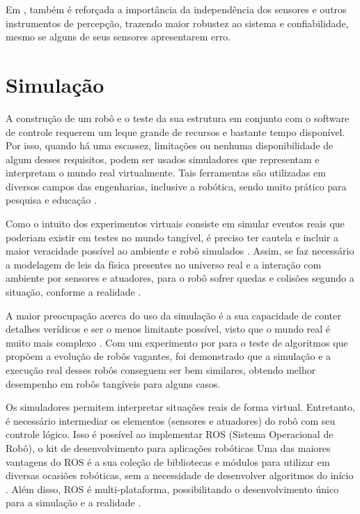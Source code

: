 Em \citet{brooks85}, também é reforçada a importância da independência dos sensores e outros instrumentos de percepção, trazendo maior robustez ao sistema e confiabilidade, mesmo se alguns de seus sensores apresentarem erro. 

\section{Simulação} %

A construção de um robô e o teste da sua estrutura em conjunto com o software de controle requerem um leque grande de recursos e bastante tempo disponível. Por isso, quando há uma escassez, limitações ou nenhuma disponibilidade de algum desses requisitos, podem ser usados simuladores que representam e interpretam o mundo real virtualmente. 
Tais ferramentas são utilizadas em diversos campos das engenharias, inclusive a robótica, sendo muito prático para pesquisa e educação \cite{usarsimCarpin:2007}. 

Como o intuito dos experimentos virtuais consiste em simular eventos reais que poderiam existir em testes no mundo tangível, é preciso ter cautela e incluir a maior veracidade possível ao ambiente e robô simulados \cite{aprendizadoHeinen:2010}.  
Assim, se faz necessário a modelagem de leis da física presentes no universo real e a interação com ambiente por sensores e atuadores, para o robô sofrer quedas e colisões segundo a situação, conforme a realidade \cite{usarsimCarpin:2007, evolucaoHeinen:2006}.  

A maior preocupação acerca do uso da simulação é a sua capacidade de conter detalhes verídicos e ser o menos limitante possível, visto que o mundo  real é muito mais complexo  \cite{wanderingMiglino:1994}. 
Com um experimento por \citet{wanderingMiglino:1994} para o teste de algoritmos que propõem a evolução de robôs vagantes, foi demonstrado que a simulação e a execução real desses robôs conseguem ser bem similares, obtendo melhor desempenho em robôs tangíveis para alguns casos.

Os simuladores permitem interpretar situações reais de forma virtual. Entretanto, é necessário intermediar os elementos (sensores e atuadores) do robô com seu controle lógico. Isso é possível ao implementar ROS (Sistema Operacional de Robô), o kit de desenvolvimento para aplicações robóticas \cite{ROS} Uma das maiores vantagens do ROS é a sua coleção de bibliotecas e módulos para utilizar em diversas ocasiões robóticas, sem a necessidade de desenvolver algoritmos do início \cite{ROS}. Além disso, ROS é multi-plataforma, possibilitando o desenvolvimento único  para a simulação e a realidade \cite{ROS}.

